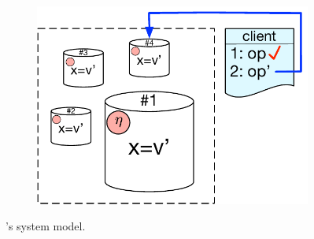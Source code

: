 \begin{figure}[b]
\begin{subfigure}[t]{0.3\textwidth}
        \centering
	\includegraphics[scale=0.32]{Figures/system_model3.pdf}
        \label{fig:sys_model3}
    \end{subfigure}
    \caption{\tool's system model.}\label{fig:system_model}
\end{figure}
